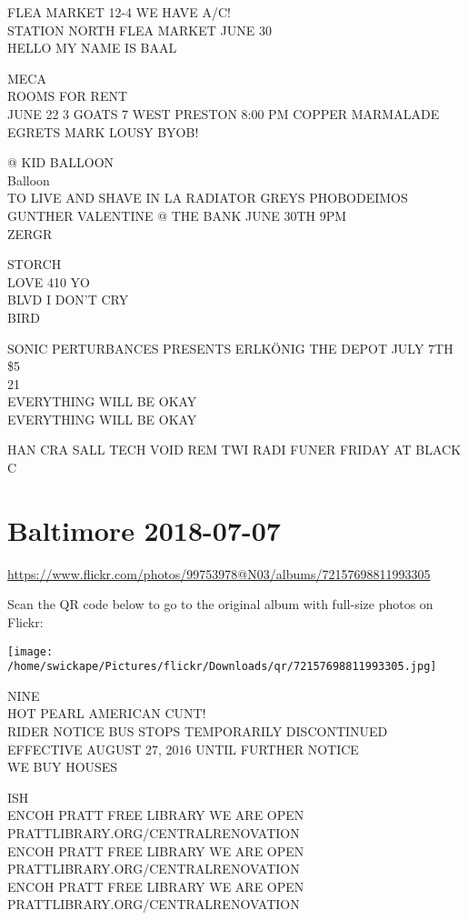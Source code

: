 \documentclass[10pt,letterpaper]{article}
\begin{document}
FLEA MARKET 12{-}4 WE HAVE A/C!\\
STATION NORTH FLEA MARKET JUNE 30\\
HELLO MY NAME IS BAAL

MECA\\
ROOMS FOR RENT\\
JUNE 22 3 GOATS 7 WEST PRESTON 8:00 PM COPPER MARMALADE EGRETS MARK LOUSY BYOB!

@ KID BALLOON\\
Balloon\\
TO LIVE AND SHAVE IN LA RADIATOR GREYS PHOBODEIMOS GUNTHER VALENTINE @ THE BANK JUNE 30TH 9PM\\
ZERGR

STORCH\\
LOVE 410 YO\\
BLVD I DON'T CRY\\
BIRD

SONIC PERTURBANCES PRESENTS ERLKÖNIG THE DEPOT JULY 7TH \$5\\
21\\
EVERYTHING WILL BE OKAY\\
EVERYTHING WILL BE OKAY

HAN CRA SALL TECH VOID REM TWI RADI FUNER FRIDAY AT BLACK C
\pagebreak

\section*{Baltimore 2018-07-07}

\url{https://www.flickr.com/photos/99753978@N03/albums/72157698811993305}

Scan the QR code below to go to the original album with full-size photos on Flickr:

\texttt{[image: /home/swickape/Pictures/flickr/Downloads/qr/72157698811993305.jpg]}
\pagebreak

NINE\\
HOT PEARL AMERICAN CUNT!\\
RIDER NOTICE BUS STOPS TEMPORARILY DISCONTINUED EFFECTIVE AUGUST 27, 2016 UNTIL FURTHER NOTICE\\
WE BUY HOUSES

ISH\\
ENCOH PRATT FREE LIBRARY WE ARE OPEN PRATTLIBRARY.ORG/CENTRALRENOVATION\\
ENCOH PRATT FREE LIBRARY WE ARE OPEN PRATTLIBRARY.ORG/CENTRALRENOVATION\\
ENCOH PRATT FREE LIBRARY WE ARE OPEN PRATTLIBRARY.ORG/CENTRALRENOVATION
\end{document}
